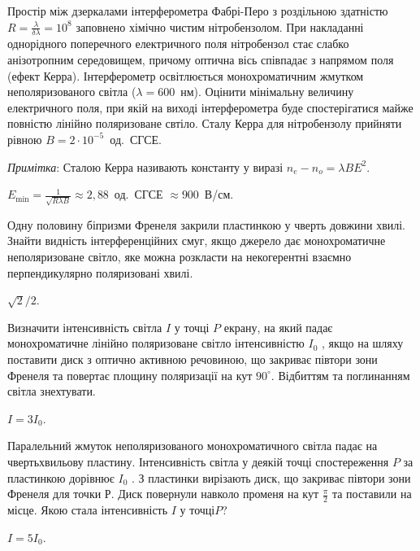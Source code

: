 \begin{problem}%
    Простір між дзеркалами інтерферометра Фабрі-Перо з роздільною здатністю $ R = \frac{\lambda}{\delta\lambda} = 10^8 $ заповнено хімічно чистим нітробензолом. При накладанні однорідного поперечного електричного поля нітробензол стає слабко анізотропним середовищем, причому оптична вісь співпадає з напрямом поля (ефект Керра). Інтерферометр освітлюється монохроматичним жмутком неполяризованого світла ($ \lambda = 600 $~нм). Оцінити мінімальну величину електричного поля, при якій на виході інтерферометра буде спостерігатися майже повністю лінійно поляризоване свтіло. Сталу Керра для нітробензолу прийняти рівною $ B = 2\cdot10^{-5} $~од.~СГСЕ.

    \medskip

    \emph{Примітка}: Сталою Керра називають константу у виразі $ n_e - n_o = \lambda B E^2  $.
    \begin{solution}
        $ E_{\min} = \frac{1}{\sqrt{R\lambda B}} \approx 2,88 $~од.~СГСЕ $ \approx 900 $~В/см.
    \end{solution}
\end{problem}

\begin{problem}%
    Одну половину біпризми Френеля закрили пластинкою у чверть
    довжини хвилі. Знайти видність інтерференційних смуг, якщо джерело
    дає монохроматичне неполяризоване світло, яке можна розкласти на
    некогерентні взаємно перпендикулярно поляризовані хвилі.
    \begin{solution}
        $ \sqrt{2}/2 $.
    \end{solution}
\end{problem}

\begin{problem}%
    Визначити інтенсивність світла $ I $ у точці $ P $ екрану, на який падає монохроматичне лінійно поляризоване світло інтенсивністю $ I_0 $ , якщо на шляху поставити диск з оптично активною речовиною, що закриває півтори зони Френеля та повертає площину поляризації на кут $ 90^\circ $. Відбиттям та поглинанням світла знехтувати.
    \begin{solution}
        $ I = 3I_0 $.
    \end{solution}
\end{problem}

\begin{problem}%
    Паралельний жмуток неполяризованого монохроматичного світла падає на чвертьхвильову пластину. Інтенсивність світла у деякій точці спостереження $ P $ за пластинкою дорівнює $ I_0 $ . З пластинки вирізають диск, що закриває півтори зони Френеля для точки Р. Диск повернули навколо променя на кут $ \frac{\pi}{2} $ та поставили на місце. Якою стала інтенсивність $ I $ у точці$  P $?
    \begin{solution}
        $ I = 5I_0 $.
    \end{solution}
\end{problem}

